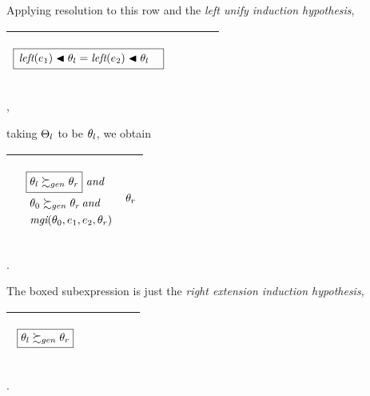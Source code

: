 \documentclass[runningheads]{llncs}
\DeclareMathOperator{\uand}{\emph{and}\,}
\DeclareMathOperator{\lef}{\emph{left}}
\DeclareMathOperator{\mgi}{\emph{mgi}}
\begin{document}
Applying resolution to this row and the \emph{left unify induction hypothesis},
  \begin{center}
  \begin{tabular}{|m{}|m{}||m{}|}
\hline
\begin{center}
{$\begin{aligned}
 &\begin{aligned}
 &\boxed{\begin{aligned}
&\lef(\e{1}) \apply \thet{l} = 
\lef(\e{2}) \apply \thet{l} 
\end{aligned}}
\end{aligned}\end{aligned}   $} 
\end{center}& &  \\  \hline
\end{tabular},
\end{center}
taking $\Theta_{l}$ to be $\theta_{l}$, we obtain
\begin{center}
\begin{tabular}{|m{}|m{}||m{}|}
 \hline 
  & 
   \begin{center}
{$\begin{aligned}
 & \boxed{\begin{aligned}
    &\thet{l} \moregen  \thet{r} \hspace {-10pt}
    \end{aligned}}\, \uand  \\
&\,   \,  \thet{0} \moregen \thet{r} \uand  \\
  &\,  \,  {\mgi}(\thet{0}, \e{1}, \e{2}, \thet{r})
\end{aligned}$}
\end{center}
& 
\begin{center}

$ \begin{aligned}
   \theta_{r}
 \end{aligned}    
$
\end{center}
\\
\hline
\end{tabular}.
\end{center}
The boxed subexpression is just the \emph{right extension induction hypothesis}, 
\begin{center}
  \begin{tabular}{|m{}|m{}||m{}|}
\hline
\begin{center}
{$
\begin{aligned}
&\begin{aligned}
&\begin{aligned}
 \,\, & \boxed{\theta_{l} \succsim_{gen} \theta_{r}} 
\end{aligned}
\end{aligned}
\end{aligned} $}  \hspace{0cm} 
\end{center}& &  \\  \hline
\end{tabular}.
\end{center}
\end{document}
